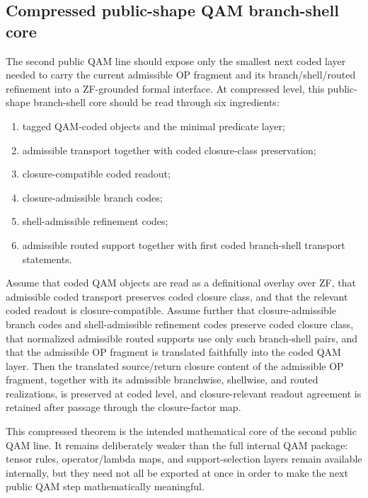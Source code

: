 \subsection*{Compressed public-shape QAM branch-shell core}
The second public QAM line should expose only the smallest next coded layer needed to carry the current admissible OP fragment and its branch/shell/routed refinement into a ZF-grounded formal interface. At compressed level, this public-shape branch-shell core should be read through six ingredients:
\begin{enumerate}[leftmargin=2em]
  \item tagged QAM-coded objects and the minimal predicate layer;
  \item admissible transport together with coded closure-class preservation;
  \item closure-compatible coded readout;
  \item closure-admissible branch codes;
  \item shell-admissible refinement codes;
  \item admissible routed support together with first coded branch-shell transport statements.
\end{enumerate}

\begin{theorem}
Assume that coded QAM objects are read as a definitional overlay over ZF, that admissible coded transport preserves coded closure class, and that the relevant coded readout is closure-compatible. Assume further that closure-admissible branch codes and shell-admissible refinement codes preserve coded closure class, that normalized admissible routed supports use only such branch-shell pairs, and that the admissible OP fragment is translated faithfully into the coded QAM layer. Then the translated source/return closure content of the admissible OP fragment, together with its admissible branchwise, shellwise, and routed realizations, is preserved at coded level, and closure-relevant readout agreement is retained after passage through the closure-factor map.
\end{theorem}


\begin{remark}
This compressed theorem is the intended mathematical core of the second public QAM line. It remains deliberately weaker than the full internal QAM package: tensor rules, operator/lambda maps, and support-selection layers remain available internally, but they need not all be exported at once in order to make the next public QAM step mathematically meaningful.
\end{remark}

